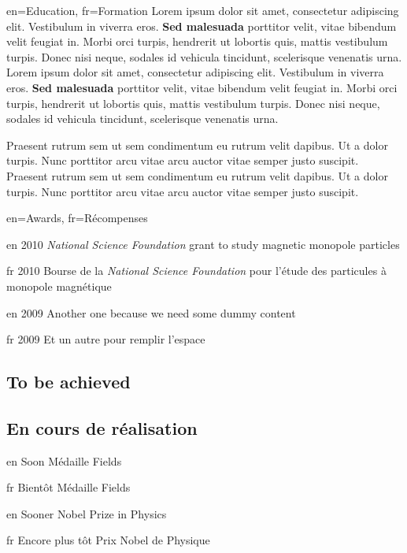 \documentclass[letter]{article}
\begin{document}
\begin{section}{en={Education}, 
              fr={Formation}}
        {Lorem ipsum dolor sit amet, consectetur adipiscing elit. Vestibulum in viverra eros. \textbf{Sed malesuada} porttitor velit, vitae bibendum velit feugiat in. Morbi orci turpis, hendrerit ut lobortis quis, mattis vestibulum turpis. Donec nisi neque, sodales id vehicula tincidunt, scelerisque venenatis urna.}
        {Lorem ipsum dolor sit amet, consectetur adipiscing elit. Vestibulum in viverra eros. \textbf{Sed malesuada} porttitor velit, vitae bibendum velit feugiat in. Morbi orci turpis, hendrerit ut lobortis quis, mattis vestibulum turpis. Donec nisi neque, sodales id vehicula tincidunt, scelerisque venenatis urna.}

        {Praesent rutrum sem ut sem condimentum eu rutrum velit dapibus. Ut a dolor turpis. \newline
         Nunc porttitor arcu vitae arcu auctor vitae semper justo suscipit.}
        {Praesent rutrum sem ut sem condimentum eu rutrum velit dapibus. Ut a dolor turpis. \newline
         Nunc porttitor arcu vitae arcu auctor vitae semper justo suscipit.}
\end{section}

\begin{section}{en={Awards}, 
              fr={R\'ecompenses}}
    \item[en]{2010} {\textit{National Science Foundation} grant to study magnetic monopole particles}
    \item[fr]{2010} {Bourse de la \textit{National Science Foundation} pour l'étude des particules à monopole magnétique}

    \item[en]{2009} {Another one because we need some dummy content}
    \item[fr]{2009} {Et un autre pour remplir l'espace}

\subsection[en]{To be achieved}
\subsection[fr]{En cours de réalisation}
    \item[en]{Soon}     {Médaille Fields}
    \item[fr]{Bientôt}  {Médaille Fields}
    \item[en]{Sooner}           {Nobel Prize in Physics}
    \item[fr]{Encore plus tôt}  {Prix Nobel de Physique}
\end{section}
\end{document}
